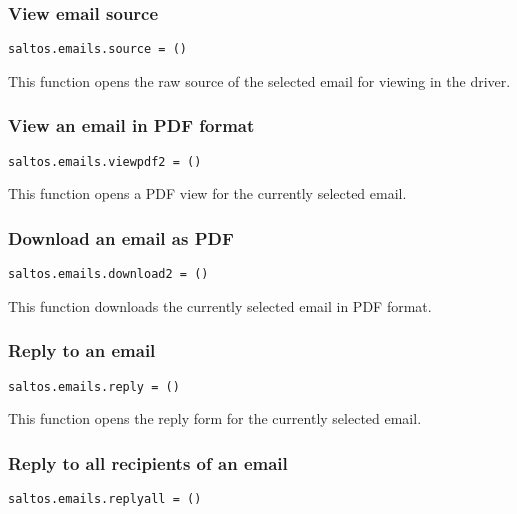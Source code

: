 \documentclass[a4paper]{article}
\begin{document}
\hypertarget{toc60}{}
\subsubsection{View email source}

\begin{lstlisting}
saltos.emails.source = ()
\end{lstlisting}

This function opens the raw source of the selected email for viewing in the driver.

\hypertarget{toc61}{}
\subsubsection{View an email in PDF format}

\begin{lstlisting}
saltos.emails.viewpdf2 = ()
\end{lstlisting}

This function opens a PDF view for the currently selected email.

\hypertarget{toc62}{}
\subsubsection{Download an email as PDF}

\begin{lstlisting}
saltos.emails.download2 = ()
\end{lstlisting}

This function downloads the currently selected email in PDF format.

\hypertarget{toc63}{}
\subsubsection{Reply to an email}

\begin{lstlisting}
saltos.emails.reply = ()
\end{lstlisting}

This function opens the reply form for the currently selected email.

\hypertarget{toc64}{}
\subsubsection{Reply to all recipients of an email}

\begin{lstlisting}
saltos.emails.replyall = ()
\end{lstlisting}
\end{document}
